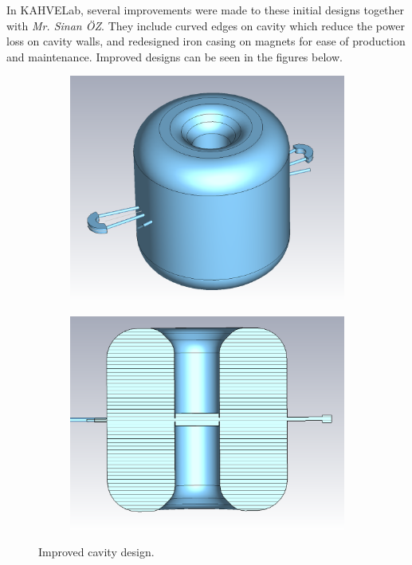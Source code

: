 \documentclass[a4paper,oneside,12pt]{report}
\numberwithin{equation}{chapter}
\begin{document}
In KAHVELab, several improvements were made to these initial designs together with \textit{Mr. Sinan ÖZ}. They include curved edges on cavity which reduce the power loss on cavity walls, and redesigned iron casing on magnets for ease of production and maintenance.
Improved designs can be seen in the figures below.
\begin{figure}[H]
    \captionsetup[subfigure]{justification=centering}
    \captionsetup{justification=centering}
    \centering
    \begin{subfigure}{.5\textwidth}
      \centering
      \includegraphics[width=.9\linewidth]{./figures/cst/cst_sinan_cavity_design1.png}
    \end{subfigure}%
    \centering
    \begin{subfigure}{.5\textwidth}
      \centering
      \includegraphics[width=.94\linewidth]{./figures/cst/cst_sinan_cavity_design2.png}
    \end{subfigure}
    \caption{Improved cavity design.}
    \label{fig:improved_cavity_design}
\end{figure}
\end{document}

